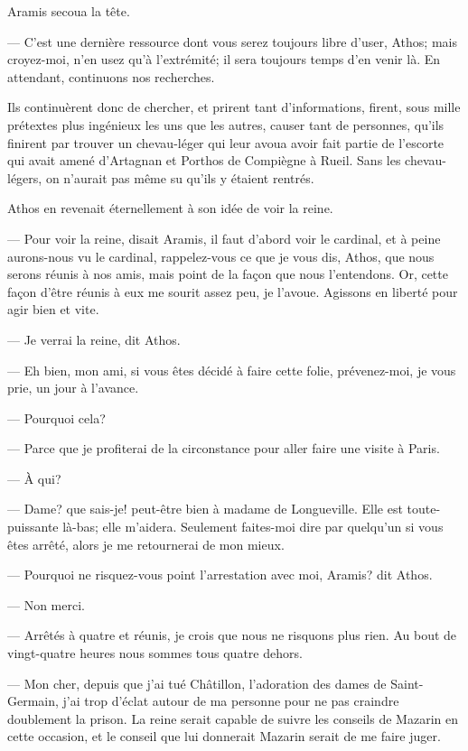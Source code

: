 Aramis secoua la tête.

— C'est une dernière ressource dont vous serez toujours libre d'user, Athos; mais croyez-moi, n'en usez qu'à l'extrémité; il sera toujours temps d'en venir là. En attendant, continuons nos recherches.

Ils continuèrent donc de chercher, et prirent tant d'informations, firent, sous mille prétextes plus ingénieux les uns que les autres, causer tant de personnes, qu'ils finirent par trouver un chevau-léger qui leur avoua avoir fait partie de l'escorte qui avait amené d'Artagnan et Porthos de Compiègne à Rueil. Sans les chevau-légers, on n'aurait pas même su qu'ils y étaient rentrés.

Athos en revenait éternellement à son idée de voir la reine.

— Pour voir la reine, disait Aramis, il faut d'abord voir le cardinal, et à peine aurons-nous vu le cardinal, rappelez-vous ce que je vous dis, Athos, que nous serons réunis à nos amis, mais point de la façon que nous l'entendons. Or, cette façon d'être réunis à eux me sourit assez peu, je l'avoue. Agissons en liberté pour agir bien et vite.

— Je verrai la reine, dit Athos.

— Eh bien, mon ami, si vous êtes décidé à faire cette folie, prévenez-moi, je vous prie, un jour à l'avance.

— Pourquoi cela?

— Parce que je profiterai de la circonstance pour aller faire une visite à Paris.

— À qui?

— Dame? que sais-je! peut-être bien à madame de Longueville. Elle est toute-puissante là-bas; elle m'aidera. Seulement faites-moi dire par quelqu'un si vous êtes arrêté, alors je me retournerai de mon mieux.

— Pourquoi ne risquez-vous point l'arrestation avec moi, Aramis? dit Athos.

— Non merci.

— Arrêtés à quatre et réunis, je crois que nous ne risquons plus rien. Au bout de vingt-quatre heures nous sommes tous quatre dehors.

— Mon cher, depuis que j'ai tué Châtillon, l'adoration des dames de Saint-Germain, j'ai trop d'éclat autour de ma personne pour ne pas craindre doublement la prison. La reine serait capable de suivre les conseils de Mazarin en cette occasion, et le conseil que lui donnerait Mazarin serait de me faire juger.

